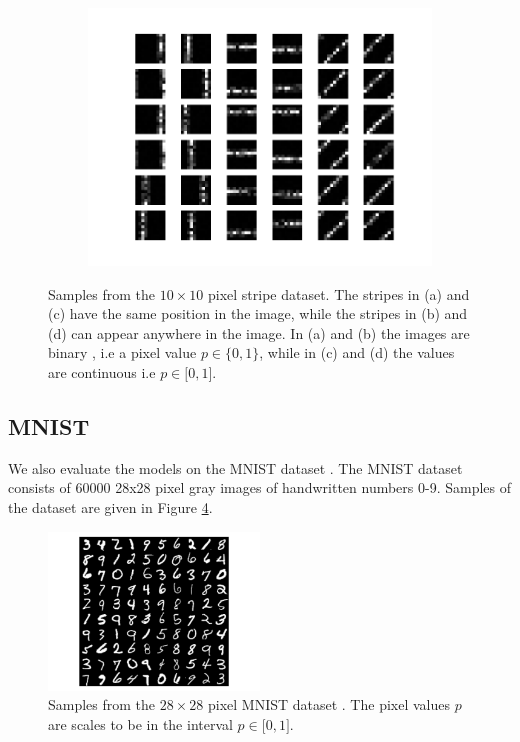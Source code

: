 \begin{figure}[h!]
\begin{subfigure}[t]{.49\textwidth}
  		\caption{}
  		\label{fig:stripes3}
	\end{subfigure}
	\begin{subfigure}[t]{.49\textwidth}
  		\centering
  		\includegraphics[width=.85\linewidth]{imgs/stripes11.png}
  		\caption{}
  		\label{fig:stripes4}
	\end{subfigure}
	\caption[Samples from the stripe dataset.]{Samples from the $10 \times 10$ pixel stripe dataset. The stripes in (a) and (c) have the same position in the image, while the stripes in (b) and (d) can appear anywhere in the image. In (a) and (b) the images are binary , i.e a pixel value $p \in \{0,1\}$, while in (c) and (d) the values are continuous i.e $p \in \lbrack 0,1 \rbrack $.  }
	\label{fig:stripes}
\end{figure}

 
\subsection{MNIST} \label{c:mnist}

We also evaluate the models on the MNIST dataset \cite{lecun-mnisthandwrittendigit-2010}. 
The MNIST dataset consists of 60000 28x28 pixel gray images of handwritten numbers 0-9.
Samples of the dataset are given in Figure \ref{fig:mnist}.

\begin{figure}[h!]
	\centering
    	\includegraphics[width=0.50\textwidth]{imgs/mnist.png} 
    \caption[Samples from the MNIST dataset.]{Samples from the $28 \times 28$ pixel MNIST dataset \cite{lecun-mnisthandwrittendigit-2010}. The pixel values $p$ are scales to be in the interval $p \in \lbrack 0,1 \rbrack $. }
	\label{fig:mnist}
\end{figure}


